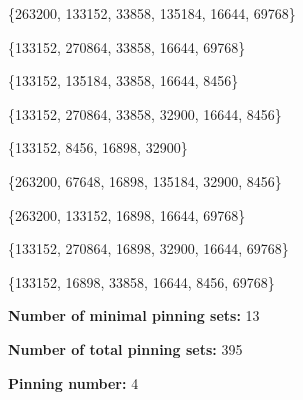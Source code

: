 \documentclass{article}%
\begin{document}
\begin{multicols}{2}
\{{263200, 133152, 33858, 135184, 16644, 69768}\}

\{{133152, 270864, 33858, 16644, 69768}\}

\{{133152, 135184, 33858, 16644, 8456}\}

\{{133152, 270864, 33858, 32900, 16644, 8456}\}

\{{133152, 8456, 16898, 32900}\}

\{{263200, 67648, 16898, 135184, 32900, 8456}\}

\{{263200, 133152, 16898, 16644, 69768}\}

\{{133152, 270864, 16898, 32900, 16644, 69768}\}

\{{133152, 16898, 33858, 16644, 8456, 69768}\}



\textbf{Number of minimal pinning sets:} 13

\textbf{Number of total pinning sets:} 395

\textbf{Pinning number:} 4


\end{multicols}
\end{document}
